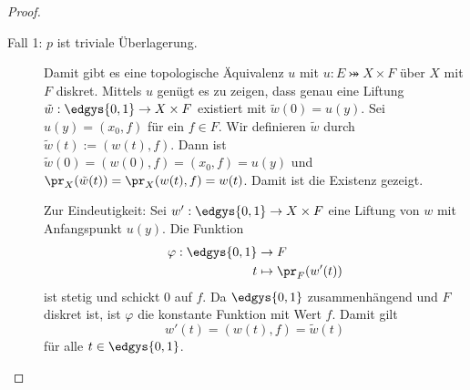 \documentclass[language=ngerman]{TemplateLecture} %
\begin{document}
\begin{proof}
    \begin{description}
        \item[Fall 1: $p$ ist triviale Überlagerung.] Damit gibt es eine topologische Äquivalenz $u$ mit $u: E \bij X \times F$ über $X$ mit $F$ diskret. Mittels $u$ genügt es zu zeigen, dass genau eine Liftung $\tilde{w}: \edgys{0,1} \to X \times F$ existiert mit $\tilde{w}(0) = u(y)$. 
        Sei $u(y) = (x_0, f)$ für ein $f \in F$. Wir definieren $\tilde{w}$ durch $\tilde{w}(t) := (w(t), f)$. Dann ist $\tilde{w}(0) = (w(0), f) = (x_0, f) = u(y)$ und $\pr_X(\tilde{w}(t)) = \pr_X(w(t),f) = w(t)$. Damit ist die Existenz gezeigt.
        
        Zur Eindeutigkeit: Sei $w': \edgys{0,1} \to X \times F$ eine Liftung von $w$ mit Anfangspunkt $u(y)$. Die Funktion 
        \begin{align*}
            \varphi: \edgys{0,1} &\to F \\
            t &\mapsto \pr_F(w'(t))
        \end{align*}
        ist stetig und schickt $0$ auf $f$. Da $\edgys{0,1}$ zusammenhängend und $F$ diskret ist, ist $\varphi$ die konstante Funktion mit Wert $f$. Damit gilt 
        \begin{equation*}
            w'(t) = (w(t), f) = \tilde{w}(t)
        \end{equation*}
        für alle $t \in \edgys{0,1}$.

        



\end{description}
\end{proof}
\end{document}

